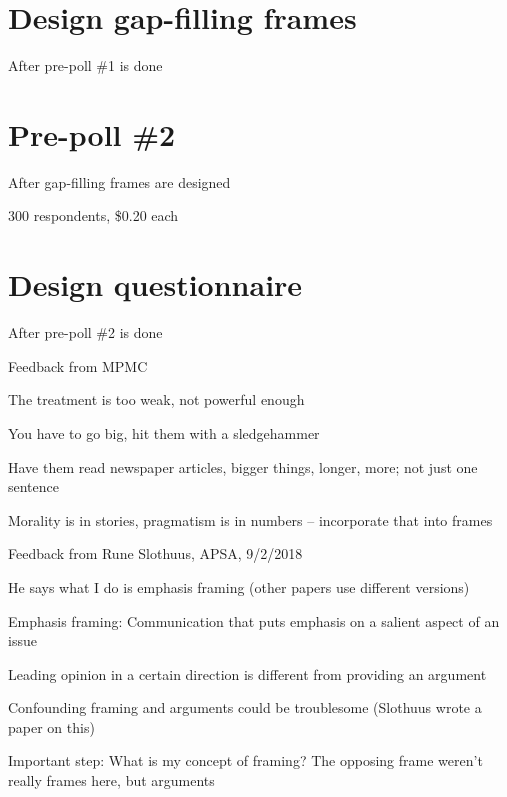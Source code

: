 \section*{Design gap-filling frames}
	\begin{coi}
		\item After pre-poll \#1 is done
	\end{coi}

\section*{Pre-poll \#2}
	\begin{coi}
		\item After gap-filling frames are designed
		\item 300 respondents, \$0.20 each
	\end{coi}

	
\section*{Design questionnaire}
	\begin{coi}
		\item After pre-poll \#2 is done
		\item Feedback from MPMC
			\begin{coi}
				\item The treatment is too weak, not powerful enough
					\begin{coi}
						\item You have to go big, hit them with a sledgehammer
						\item Have them read newspaper articles, bigger things, longer, more; not just one sentence
					\end{coi}
				\item Morality is in stories, pragmatism is in numbers -- incorporate that into frames
			\end{coi}
		\item Feedback from Rune Slothuus, APSA, 9/2/2018
			\begin{coi}
				\item He says what I do is emphasis framing (other papers use different versions)
				\item Emphasis framing: Communication that puts emphasis on a salient aspect of an issue
				\item Leading opinion in a certain direction is different from providing an argument
				\item Confounding framing and arguments could be troublesome (Slothuus wrote a paper on this)
				\item Important step: What is my concept of framing? The opposing frame weren't really frames here, but arguments
			\end{coi}
	\end{coi}

